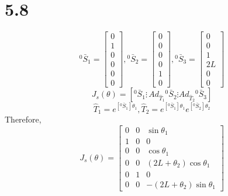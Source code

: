 \documentclass[onecolumn,oneside]{SUSTechHomework}
\begin{document}
  \section*{5.8}
  \[
  {}^0\bar{S}_1 = \begin{bmatrix}
    0 \\ 1 \\ 0 \\ 0 \\ 0 \\ 0 
  \end{bmatrix},
  {}^0\bar{S}_2 = \begin{bmatrix}
    0 \\ 0 \\ 0 \\ 0 \\ 1 \\ 0
  \end{bmatrix},
  {}^0\bar{S}_3 = \begin{bmatrix}
    0 \\ 0 \\ 1 \\ 2L \\ 0 \\ 0 
  \end{bmatrix}
  \]
  \[
    J_s(\theta) = [{}^0\bar{S}_1 \vdots \, Ad_{\hat{T}_1}{}^0\bar{S}_2 \vdots Ad_{\hat{T}_2}{}^0\bar{S}_3]
  \]
  \[
    \hat{T}_1 = e^{[{}^0\bar{S}_1]\theta_1}, \hat{T}_2 = e^{[{}^0\bar{S}_1]\theta_1}e^{[{}^0\bar{S}_2]\theta_2}
  \]
  Therefore,
  \[
    J_s(\theta) = \begin{bmatrix}
      0 & 0 & \sin \theta_1 \\
      1 & 0 & 0 \\
      0 & 0 & \cos \theta_1 \\
      0 & 0 & (2L + \theta_2) \cos \theta_1 \\
      0 & 1 & 0 \\
      0 & 0 & -(2L + \theta_2) \sin \theta_1
      \end{bmatrix}
  \]
\end{document}
